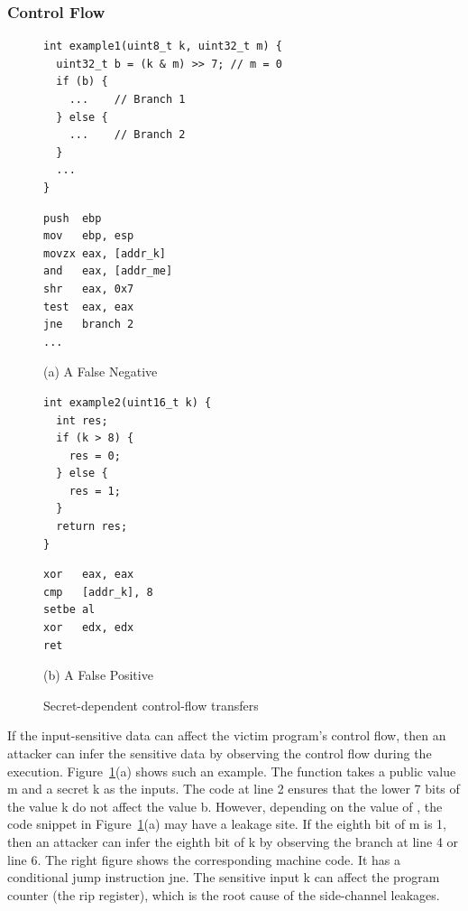 \subsubsection{Control Flow}
\begin{figure}[ht]
  \begin{minipage}{0.45\linewidth}
    \begin{lstlisting}[xleftmargin=.05\textwidth, xrightmargin=.0\textwidth, frame=none]
int example1(uint8_t k, uint32_t m) { 
  uint32_t b = (k & m) >> 7; // m = 0
  if (b) {
    ...    // Branch 1
  } else {
    ...    // Branch 2
  }
  ...
}
\end{lstlisting}
  \end{minipage}
  \hfill
  \begin{minipage}{0.45\linewidth}
    \begin{lstlisting}[xleftmargin=.05\textwidth, xrightmargin=.00\textwidth, frame=none, numbers=none, mathescape=true]
push  ebp
mov   ebp, esp
movzx eax, [addr_k]    
and   eax, [addr_me] 
shr   eax, 0x7           
test  eax, eax
jne   branch 2
...
\end{lstlisting}
  \end{minipage}\caption*{(a) A False Negative}

  \begin{minipage}{0.45\linewidth}
    \begin{lstlisting}[xleftmargin=.05\textwidth, xrightmargin=.0\textwidth, frame=none]
int example2(uint16_t k) {
  int res;
  if (k > 8) {
    res = 0;
  } else {
    res = 1;
  }
  return res;
}
\end{lstlisting}
  \end{minipage}
  \hfill
  \begin{minipage}{0.45\linewidth}
    \begin{lstlisting}[xleftmargin=.05\textwidth, xrightmargin=.00\textwidth, frame=none, numbers=none, mathescape=true]
xor   eax, eax
cmp   [addr_k], 8
setbe al
xor   edx, edx
ret
\end{lstlisting}
  \end{minipage}\caption*{(b) A False Positive}
  \caption{Secret-dependent control-flow transfers}\label{fig:chapter3:cf}
\end{figure}

If the input-sensitive data can affect the victim program's control flow, then an attacker can infer the sensitive data by observing the control flow during the execution. Figure~\ref{fig:chapter3:cf}(a) shows such an example. The function takes a public value \textsf{m} and a secret \textsf{k} as the inputs. The code at line 2 ensures that the lower 7 bits of the value \textsf{k} do not affect the value \textsf{b}. However, depending on the value of , the code snippet in Figure~\ref{fig:chapter3:cf}(a) may have a leakage site. If the eighth bit of \textsf{m} is 1, then an attacker can infer the eighth bit of \textsf{k} by observing the branch at line 4 or line 6. The right figure shows the corresponding machine code. It has a conditional jump instruction \textsf{jne}. The sensitive input \textsf{k} can affect the program counter (the \textsf{rip} register), which is the root cause of the side-channel leakages.

